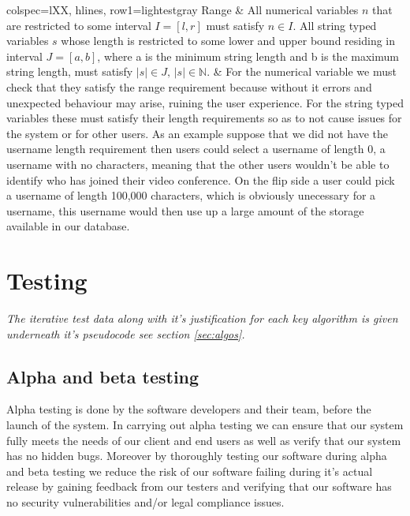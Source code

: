 \begin{longtblr}[
  caption={Data validation rules.}
]{colspec={lXX}, hlines, row{1}={lightestgray}}
Range & {All numerical variables $n$ that are restricted to some
interval $I = [l, r]$ must satisfy $n \in I$. All string typed variables $s$
whose length is restricted to some lower and upper bound residing in
interval $J = [a, b]$, where a is the minimum string length and b is 
the maximum string length,
must satisfy 
$\left|s\right| \in J, \, \left|s\right| \in \mathbb{N} $}. & {For 
the numerical variable we must check 
that they satisfy the range requirement because without it errors and
unexpected behaviour may arise, ruining the user experience. For the 
string typed variables these must satisfy their length requirements so as
to not cause issues for the system or for other users. As an example suppose
that we did not have the username length requirement then users could select 
a username of length 0, a username with no characters, meaning that the other 
users wouldn't be able to identify who has joined their video conference. On the
flip side a user could pick a username of length 100,000 characters, which is
obviously unecessary for a username, this username would then use up a large 
amount of the storage available in our database.}\\

\end{longtblr}


\section{Testing}

\textit{The iterative test data along with it's
justification for each key algorithm is given
underneath it's pseudocode see section 
\ref{sec:algos}.}\\ \vspace{0.2cm}

\subsection{Alpha and beta testing}

Alpha testing is done by the software developers and their
team, before the launch of the system. In carrying out alpha
testing we can ensure that our system fully meets the needs
of our client and end users as well as verify that our system
has no hidden bugs. Moreover by thoroughly testing our
software during alpha and beta testing we reduce the risk
of our software failing during it's actual release by 
gaining feedback from our testers and verifying that our 
software has no security vulnerabilities and/or legal
compliance issues. \\ \vspace{0.2cm}

